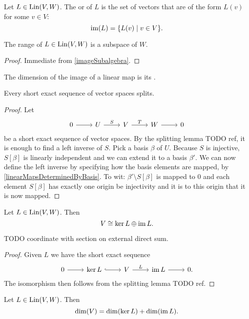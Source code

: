 \begin{definition}
Let $L \in \operatorname{Lin}(V,W)$. The  or  of $L$ is the set of vectors that are of the form $L(v)$ for some $v\in V$:
\[ \im(L) = \setbuilder{L(v)}{v\in V}. \]
\end{definition}

\begin{lemma}
The range of $L\in \operatorname{Lin}(V,W)$ is a subspace of $W$.
\end{lemma}
\begin{proof}
Immediate from \ref{imageSubalgebra}.
\end{proof}
\begin{definition}
The dimension of the image of a linear map is its .
\end{definition}

\begin{theorem}
Every short exact sequence of vector spaces splits.
\end{theorem}
\begin{proof}
Let
\[ \begin{tikzcd}
0 \rar & U \rar{S} & V \rar{T} & W \rar & 0
\end{tikzcd} \]
be a short exact sequence of vector spaces.
By the splitting lemma TODO ref, it is enough to find a left inverse of $S$. Pick a basis $\beta$ of $U$. Because $S$ is injective, $S[\beta]$ is linearly independent and we can extend it to a basis $\beta'$. We can now define the left inverse by specifying how the basis elements are mapped, by \ref{linearMapsDeterminedByBasis}. To wit: $\beta'\setminus S[\beta]$ is mapped to $0$ and each element $S[\beta]$ has exactly one origin be injectivity and it is to this origin that it is now mapped.
\end{proof}
\begin{corollary} \label{directSumKernelImage}
Let $L \in \operatorname{Lin}(V,W)$. Then
\[ V \cong \ker L \oplus \operatorname{im} L. \]
\end{corollary}
TODO coordinate with section on external direct sum.
\begin{proof}
Given $L$ we have the short exact sequence
\[ \begin{tikzcd}
0 \rar & \ker L \ar[r, hook] & V \rar{L} & \im L \rar & 0.
\end{tikzcd} \]
The isomorphism then follows from the splitting lemma TODO ref.
\end{proof}
\begin{corollary} \label{dimensionLinearMaps}
Let $L \in \operatorname{Lin}(V,W)$. Then
\[ \dim(V) = \dim(\ker L) + \dim(\operatorname{im} L). \]
\end{corollary}
